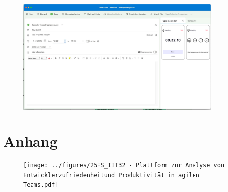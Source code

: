 \documentclass[12pt,a4paper]{report}
\begin{document}
    \begin{figure}[H]
    \centering
    \includegraphics[width=0.90\textwidth]{../figures/mockup/IP5_Yappi_Companion_Outlook_Prototype.pdf}
    \end{figure}

    \section{Anhang}

    \begin{figure}[H]
    \centering
    \texttt{[image: ../figures/25FS\_IIT32 - Plattform zur Analyse von Entwicklerzufriedenheitund Produktivität in agilen Teams.pdf]}
    \end{figure}
\end{document}
